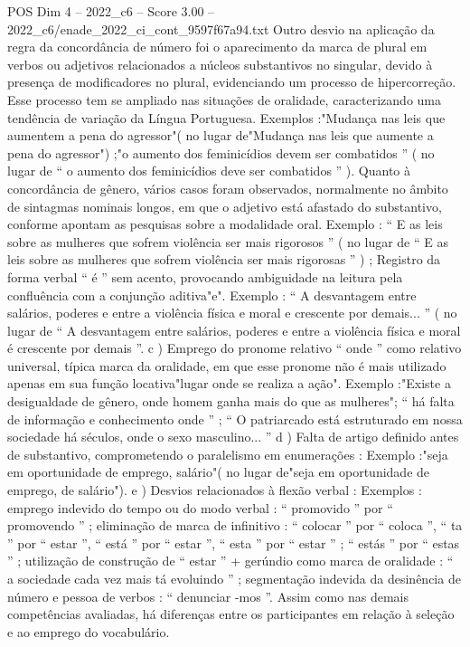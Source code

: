 \begin{textsample}{POS Dim 4 – 2022\_c6 – Score 3.00 – 2022\_c6/enade\_2022\_ci\_cont\_9597f67a94.txt}
Outro desvio na aplicação da regra da concordância de número foi o aparecimento da marca de plural em verbos ou adjetivos relacionados a núcleos substantivos no singular, devido à presença de modificadores no plural, evidenciando um processo de hipercorreção.
Esse processo tem se ampliado nas situações de oralidade, caracterizando uma tendência de variação da Língua Portuguesa.
Exemplos :"Mudança nas leis que aumentem a pena do agressor"( no lugar de"Mudança nas leis que aumente a pena do agressor") ;"o aumento dos feminicídios devem ser combatidos ” ( no lugar de “ o aumento dos feminicídios deve ser combatidos ” ).
Quanto à concordância de gênero, vários casos foram observados, normalmente no âmbito de sintagmas nominais longos, em que o adjetivo está afastado do substantivo, conforme apontam as pesquisas sobre a modalidade oral.
Exemplo : “ E as leis sobre as mulheres que sofrem violência ser mais rigorosos ” ( no lugar de “ E as leis sobre as mulheres que sofrem violência ser mais rigorosas ” ) ; Registro da forma verbal “ é ” sem acento, provocando ambiguidade na leitura pela confluência com a conjunção aditiva"e".
Exemplo : “ A desvantagem entre salários, poderes e entre a violência física e moral e crescente por demais... ” ( no lugar de “ A desvantagem entre salários, poderes e entre a violência física e moral é crescente por demais ”. c ) Emprego do pronome relativo “ onde ” como relativo universal, típica marca da oralidade, em que esse pronome não é mais utilizado apenas em sua função locativa"lugar onde se realiza a ação".
Exemplo :"Existe a desigualdade de gênero, onde homem ganha mais do que as mulheres"; “ há falta de informação e conhecimento onde ” ; “ O patriarcado está estruturado em nossa sociedade há séculos, onde o sexo masculino... ” d ) Falta de artigo definido antes de substantivo, comprometendo o paralelismo em enumerações : Exemplo :"seja em oportunidade de emprego, salário"( no lugar de"seja em oportunidade de emprego, de salário"). e ) Desvios relacionados à flexão verbal : Exemplos : emprego indevido do tempo ou do modo verbal : “ promovido ” por “ promovendo ” ; eliminação de marca de infinitivo : “ colocar ” por “ coloca ”, “ ta ” por “ estar ”, “ está ” por “ estar ”, “ esta ” por “ estar ” ; “ estás ” por “ estas ” ; utilização de construção de “ estar ” + gerúndio como marca de oralidade : “ a sociedade cada vez mais tá evoluindo ” ; segmentação indevida da desinência de número e pessoa de verbos : “ denunciar -mos ”.
Assim como nas demais competências avaliadas, há diferenças entre os participantes em relação à seleção e ao emprego do vocabulário.

\end{textsample}
